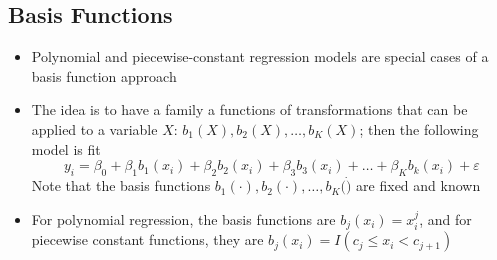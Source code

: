 \documentclass[12pt]{article}
\begin{document}
\subsection{Basis Functions}
\begin{itemize} 
\item Polynomial and piecewise-constant regression models are special cases of a basis function approach
\item The idea is to have a family a functions of transformations that can be applied to a variable $X$: $b_1(X), b_2(X),\dots,b_K(X)$; then the following model is fit
$$y_i = \beta_0 + \beta_1b_1(x_i) + \beta_2b_2(x_i) + \beta_3b_3(x_i) + \dots + \beta_Kb_k(x_i) + \varepsilon $$ 
Note that the basis functions $b_1(\cdot), b_2(\cdot),\dots,b_K(\dot)$ are fixed and known
\item For polynomial regression, the basis functions are $b_j(x_i) = x_i^j$, and for piecewise constant functions, they are $b_j(x_i) = I(c_j \leq x_i < c_{j+1})$
\end{itemize}
\end{document}
